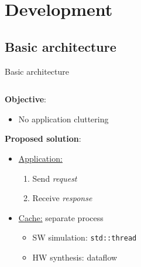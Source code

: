 \documentclass[aspectratio=169]{beamer}
\begin{document}
\section{Development}
\subsection{Basic architecture}
\begin{frame}{Basic architecture}
	\begin{columns}
		\begin{column}{.5\textwidth}
			\textbf{Objective}:
			\begin{itemize}
				\item No application cluttering
			\end{itemize}

			\bigskip
			\textbf{Proposed solution}:
			\begin{itemize}
				\item \underline{Application:}
					\begin{enumerate}
						\item Send \emph{request}
						\item Receive \emph{response}
					\end{enumerate}
				\item \underline{Cache:} separate process
					\begin{itemize}
						\item {SW simulation:} \texttt{std::thread}
						\item {HW synthesis:} dataflow
					\end{itemize}
			\end{itemize}
		\end{column}
		\begin{column}{.5\textwidth}
			\begin{center}

\end{center}
\end{column}
\end{columns}
\end{frame}
\end{document}

